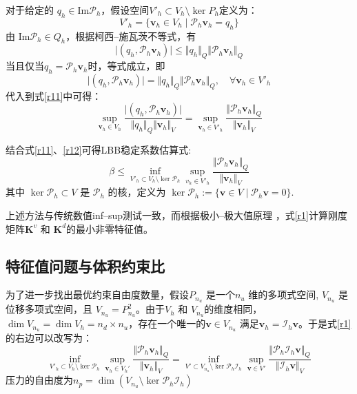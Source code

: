 对于给定的 $q_h\in \mathrm{Im}\mathcal P_h$，假设空间$V'_h \subset V_h\setminus \ker P_h$定义为：
\begin{equation}
    V'_h = \{ \boldsymbol v_h \in V_h \; \vert \; \mathcal P_h \boldsymbol v_h = q_h \}
\end{equation}
由 $\mathrm{Im}\mathcal P_h \in Q_h$，根据柯西--施瓦茨不等式，有
\begin{equation}
    \vert (q_h,\mathcal P_h \boldsymbol v_h) \vert \le \Vert q_h \Vert_Q \Vert \mathcal P_h \boldsymbol v_h \Vert_Q
\end{equation}
当且仅当$q_h=\mathcal P_h \boldsymbol v_h$时，等式成立，即
\begin{equation}
    \vert (q_h,\mathcal P_h \boldsymbol v_h) \vert = \Vert q_h \Vert_Q \Vert \mathcal P_h \boldsymbol v_h \Vert_Q, \quad \forall \boldsymbol v_h \in V'_h
\end{equation}
代入到式\eqref{r11}中可得：
\begin{equation}\label{r12}
    \sup_{\boldsymbol v_h\in V_h} \frac{\vert (q_h,\mathcal P_h \boldsymbol v_h) \vert}{\Vert q_h \Vert_Q \Vert \boldsymbol v_h \Vert_V} =
    \sup_{\boldsymbol v_h\in V'_h} \frac{\Vert \mathcal P_h \boldsymbol v_h \Vert_Q}{\Vert \boldsymbol v_h \Vert_V} 
\end{equation}

结合式\eqref{r11}、\eqref{r12}可得LBB稳定系数估算式:
\begin{equation}\label{r1}
    \beta \le \inf_{V'_h \subset V_h \setminus \ker \mathcal P_h} \sup_{v_h \in V'_h} \frac{\Vert \mathcal P_h \boldsymbol v_h \Vert_Q}{\Vert \boldsymbol v_h \Vert_V}
\end{equation}
其中 $\ker \mathcal P_h \subset V$ 是 $\mathcal P_h$ 的核，定义为 $\ker \mathcal P_h := \{ \boldsymbol v \in V \;\vert\; \mathcal P_h \boldsymbol v = 0 \}$.

上述方法与传统数值inf--sup测试一致\cite{malkus1981}，而根据极小--极大值原理 \cite{babuska1991a}，式\eqref{r1}计算刚度矩阵$\boldsymbol K^v$ 和 $\boldsymbol K^d$的最小非零特征值。
\subsection{特征值问题与体积约束比}

为了进一步找出最优约束自由度数量，假设$P_{n_u}$ 是一个$n_u$ 维的多项式空间, $V_{n_u}$ 是位移多项式空间，且 $V_{n_u} = P_{n_u}^2$。由于$V_h$ 和 $V_{n_u}$的维度相同，$\dim V_{n_u}=\dim V_h = n_d\times n_u$，存在一个唯一的$\boldsymbol v \in V_{n_u}$ 满足$\boldsymbol v_h = \mathcal I_h \boldsymbol v$。于是式\eqref{r1}的右边可以改写为：
\begin{equation}\label{r21}
    \inf_{V'_h \subset V_h\setminus \ker \mathcal P_h}\sup_{\boldsymbol v_h \in V_h'} \frac{\Vert \mathcal P_h \boldsymbol v_h \Vert_Q}{\Vert \boldsymbol v_h \Vert_V} = 
    \inf_{V'\subset V_{n_u}\setminus \ker \mathcal P_h \mathcal I_h}\sup_{\boldsymbol v \in V'} \frac{\Vert \mathcal P_h \mathcal I_h \boldsymbol v \Vert_Q}{\Vert \mathcal I_h \boldsymbol v \Vert_V}
\end{equation}
压力的自由度为$n_p = \dim(V_{n_u}\setminus \ker \mathcal P_h \mathcal I_h)$

